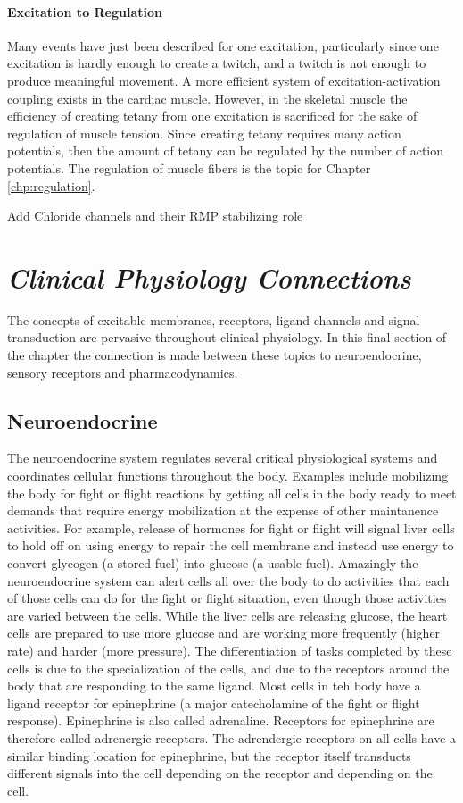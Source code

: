 \paragraph{Excitation to Regulation}

Many events have just been described for one excitation, particularly since one excitation is hardly enough to create a twitch, and a twitch is not enough to produce meaningful movement. A more efficient system of excitation-activation coupling exists in the cardiac muscle. However, in the skeletal muscle the efficiency of creating tetany from one excitation is sacrificed for the sake of regulation of muscle tension. Since creating tetany requires many action potentials, then the amount of tetany can be regulated by the number of action potentials. The regulation of muscle fibers is the topic for Chapter \ref{chp:regulation}.


Add Chloride channels and their RMP stabilizing role

\section{\textit{Clinical Physiology Connections}}

The concepts of excitable membranes, receptors, ligand channels and signal transduction are pervasive throughout clinical physiology. In this final section of the chapter the connection is made between these topics to neuroendocrine, sensory receptors and pharmacodynamics.

\subsection{Neuroendocrine}

The neuroendocrine system regulates several critical physiological systems and coordinates cellular functions throughout the body. Examples include mobilizing the body for fight or flight reactions by getting all cells in the body ready to meet demands that require energy mobilization at the expense of other maintanence activities. For example, release of hormones for fight or flight will signal liver cells to hold off on using energy to repair the cell membrane and instead use energy to convert glycogen (a stored fuel) into glucose (a usable fuel). Amazingly the neuroendocrine system can alert cells all over the body to do activities that each of those cells can do for the fight or flight situation, even though those activities are varied between the cells. While the liver cells are releasing glucose, the heart cells are prepared to use more glucose and are working more frequently (higher rate) and harder (more pressure). The differentiation of tasks completed by these cells is due to the specialization of the cells, and due to the receptors around the body that are responding to the same ligand. Most cells in teh body have a ligand receptor for epinephrine (a major catecholamine of the fight or flight response). Epinephrine is also called adrenaline. Receptors for epinephrine are therefore called adrenergic receptors. The adrendergic receptors on all cells have a similar binding location for epinephrine, but the receptor itself transducts different signals into the cell depending on the receptor and depending on the cell. 

